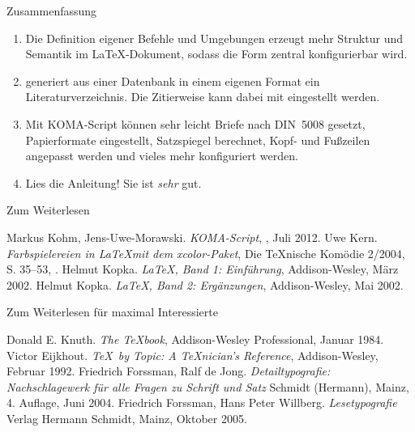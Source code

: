 \begin{frame}[fragile]{Zusammenfassung}
  \begin{enumerate}
    \item Die Definition \alert{eigener Befehle und Umgebungen}
      erzeugt \alert{mehr Struktur} und \alert{Semantik} im \LaTeX-Dokument,
      sodass die \alert{Form zentral konfigurierbar} wird.
    \item \alert{\BibTeX} generiert aus einer \alert{Datenbank} in einem eigenen Format
      ein \alert{Literaturverzeichnis}. Die \alert{Zitierweise} kann dabei mit
      \lstinline-- eingestellt werden.
    \item Mit \alert{KOMA-Script} können sehr leicht \alert{Briefe
          nach DIN~5008} gesetzt, \alert{Papierformate} eingestellt, \alert{Satzspiegel}
      berechnet, \alert{Kopf- und Fußzeilen} angepasst werden und vieles
      mehr konfiguriert werden.
    \item \alert{Lies die Anleitung!} Sie ist \emph{sehr} gut.
  \end{enumerate}
\end{frame}

\begin{Frame}[fragile]{Zum Weiterlesen}
  \begin{mybib}
      Markus Kohm, Jens-Uwe-Morawski.
      \newblock \emph{KOMA-Script},
      \newblock {}, Juli 2012.
      Uwe Kern.
      \newblock \emph{Farbspielereien in \LaTeX mit dem xcolor-Paket},
      \newblock Die \TeX nische Komödie 2/2004, S. 35--53,
      \newblock {}.
      Helmut Kopka.
      \newblock \emph{\LaTeX, Band 1: Einführung},
      \newblock Addison-Wesley, März 2002.
      Helmut Kopka.
      \newblock \emph{\LaTeX, Band 2: Ergänzungen},
      \newblock Addison-Wesley, Mai 2002.
  \end{mybib}
\end{Frame}

\begin{Frame}[fragile]{Zum Weiterlesen für maximal Interessierte}
  \begin{mybib}
      Donald E. Knuth.
      \newblock \emph{The \TeX book},
      \newblock Addison-Wesley Professional, Januar 1984.
      Victor Eijkhout.
      \newblock \emph{\TeX\ by Topic: A \TeX nician's Reference},
      \newblock Addison-Wesley, Februar 1992.
      Friedrich Forssman, Ralf de Jong.
      \newblock \emph{Detailtypografie: Nachschlagewerk für alle Fragen zu Schrift und Satz}
      \newblock Schmidt (Hermann), Mainz, 4. Auflage, Juni 2004.
      Friedrich Forssman, Hans Peter Willberg.
      \newblock \emph{Lesetypografie}
      \newblock Verlag Hermann Schmidt, Mainz, Oktober 2005.
  \end{mybib}
\end{Frame}
